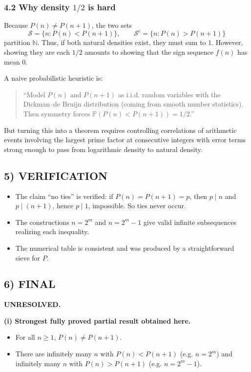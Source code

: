 \subsubsection*{4.2 Why density $1/2$ is hard}
Because $P(n)\neq P(n+1)$, the two sets
\[
\mathcal{S} = \{n: P(n)<P(n+1)\},\qquad \mathcal{S}^c = \{n: P(n)>P(n+1)\}
\]
partition $\mathbb{N}$. Thus, if both natural densities exist, they must sum to $1$. However, showing they are each $1/2$ amounts to showing that the sign sequence $f(n)$ has mean $0$.

A naive probabilistic heuristic is:
\begin{quote}
``Model $P(n)$ and $P(n+1)$ as i.i.d. random variables with the Dickman--de Bruijn distribution (coming from smooth number statistics). Then symmetry forces $\mathbb{P}(P(n)<P(n+1))=1/2$.''
\end{quote}
But turning this into a theorem requires controlling correlations of arithmetic events involving the largest prime factor at consecutive integers with error terms strong enough to pass from logarithmic density to natural density.

\subsection*{5) VERIFICATION}
\begin{itemize}[leftmargin=2em]
\item The claim ``no ties'' is verified: if $P(n)=P(n+1)=p$, then $p\mid n$ and $p\mid (n+1)$, hence $p\mid 1$, impossible. So ties never occur.
\item The constructions $n=2^m$ and $n=2^m-1$ give valid infinite subsequences realizing each inequality.
\item The numerical table is consistent and was produced by a straightforward sieve for $P$.
\end{itemize}

\subsection*{6) FINAL}
\textbf{UNRESOLVED.}

\smallskip
\noindent\textbf{(i) Strongest fully proved partial result obtained here.}
\begin{itemize}[leftmargin=2em]
\item For all $n\ge1$, $P(n)\neq P(n+1)$.
\item There are infinitely many $n$ with $P(n)<P(n+1)$ (e.g. $n=2^m$) and infinitely many $n$ with $P(n)>P(n+1)$ (e.g. $n=2^m-1$).
\end{itemize}

